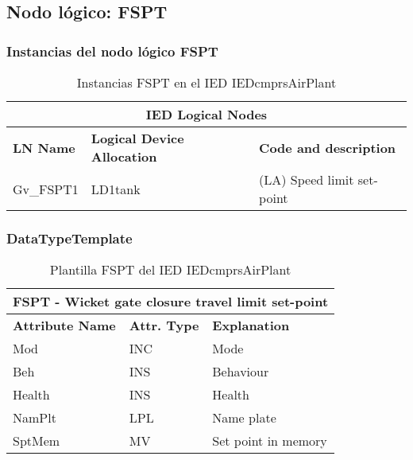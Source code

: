 
\subsection{Nodo l\'ogico: 			 FSPT}

    \subsubsection{Instancias del nodo l\'ogico FSPT}
    \begin{table}[H]
    \begin{center}
    \begin{tabular}{|l|l|p{6.8cm}|}
            \hline
            \multicolumn{3}{|c|}{\cellcolor[gray]{0.8} \textbf{IED Logical Nodes} } \\
            \hline
            \textbf{LN Name} & \textbf{Logical Device Allocation} & \textbf{Code and description} \\
            \hline
            Gv\_FSPT1 & LD1tank & (LA) Speed limit set-point \\
            \hline
    \end{tabular}
    \caption{Instancias FSPT en el IED IEDcmprsAirPlant}
    \label{table:lnInstFSPT_for_flim}
    \end{center}
    \end{table}
    
    
    
    \subsubsection{DataTypeTemplate}
    \begin{table}[H]
    \begin{center}
    \begin{tabular}{|l|l|p{8.5cm}|}
            \hline
            \multicolumn{3}{|c|}{\cellcolor[gray]{0.8} \textbf{ FSPT}  - Wicket gate closure travel limit set-point} \\
            \hline
            \textbf{Attribute Name} & \textbf{Attr. Type} & \textbf{Explanation} \\
            \hline 
            Mod & INC & Mode \\
            \hline
            Beh & INS & Behaviour \\
            \hline
            Health & INS & Health \\
            \hline
            NamPlt & LPL & Name plate \\
            \hline
            SptMem & MV & Set point in memory \\
            \hline
    \end{tabular}
    \caption{Plantilla FSPT del IED IEDcmprsAirPlant}
    \label{table:lnTypeFSPT_for_flim}
    \end{center}
    \end{table}
    
    
    